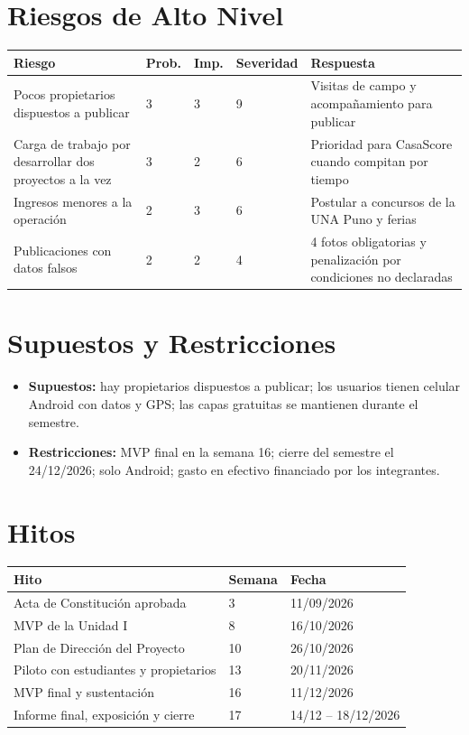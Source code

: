 \documentclass[11pt,a4paper]{article}
\begin{document}
\section{Riesgos de Alto Nivel}
{\small
\noindent\begin{tabularx}{\textwidth}{@{}L C{1.0cm} C{1.0cm} C{1.6cm} L@{}}
\toprule
{}
\textbf{Riesgo} & \textbf{Prob.} & \textbf{Imp.} & \textbf{Severidad} & \textbf{Respuesta} \\
\midrule
Pocos propietarios dispuestos a publicar & 3 & 3 & 9 & Visitas de campo y acompañamiento para publicar \\
Carga de trabajo por desarrollar dos proyectos a la vez & 3 & 2 & 6 & Prioridad para CasaScore cuando compitan por tiempo \\
Ingresos menores a la operación & 2 & 3 & 6 & Postular a concursos de la UNA Puno y ferias \\
Publicaciones con datos falsos & 2 & 2 & 4 & 4 fotos obligatorias y penalización por condiciones no declaradas \\
\bottomrule
\end{tabularx}
}

\section{Supuestos y Restricciones}
\begin{itemize}[leftmargin=*]
    \item \textbf{Supuestos:} hay propietarios dispuestos a publicar; los usuarios tienen celular Android con datos y GPS; las capas gratuitas se mantienen durante el semestre.
    \item \textbf{Restricciones:} MVP final en la semana 16; cierre del semestre el 24/12/2026; solo Android; gasto en efectivo financiado por los integrantes.
\end{itemize}

\section{Hitos}
{\small
\noindent\begin{tabularx}{\textwidth}{@{}L C{1.4cm} P{2.6cm}@{}}
\toprule
{}
\textbf{Hito} & \textbf{Semana} & \textbf{Fecha} \\
\midrule
Acta de Constitución aprobada & 3 & 11/09/2026 \\
MVP de la Unidad I & 8 & 16/10/2026 \\
Plan de Dirección del Proyecto & 10 & 26/10/2026 \\
Piloto con estudiantes y propietarios & 13 & 20/11/2026 \\
MVP final y sustentación & 16 & 11/12/2026 \\
Informe final, exposición y cierre & 17 & 14/12 -- 18/12/2026 \\
\bottomrule
\end{tabularx}
}
\end{document}
